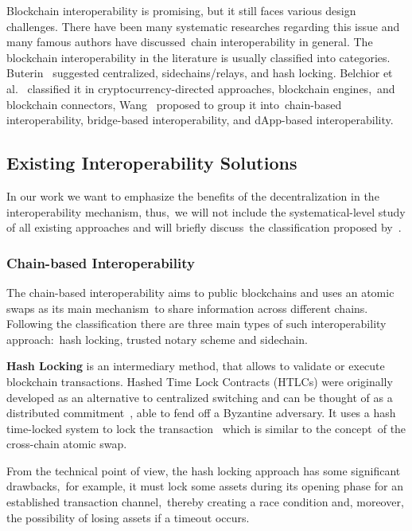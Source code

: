 Blockchain interoperability is promising, but it still faces various design
challenges.
There have been many systematic researches regarding this issue and many famous authors have discussed\
chain interoperability in general.
The blockchain interoperability in the literature is usually classified into categories.
Buterin~\cite{buterin2016} suggested centralized, sidechains/relays, and hash locking.
Belchior et al.~\cite{belchior2021survey} classified it in cryptocurrency-directed approaches, blockchain engines,\
and blockchain connectors, Wang~\cite{cryptoeprint:2021/537} proposed to group it into\
chain-based interoperability, bridge-based interoperability, and dApp-based interoperability.

\subsection{Existing Interoperability Solutions}\label{subsec:interoperability-categories}
In our work we want to emphasize the benefits of the decentralization in the interoperability mechanism, thus,\
we will not include the systematical-level study of all existing approaches and will briefly discuss\
the classification proposed by~\cite{cryptoeprint:2021/537}.

\subsubsection{Chain-based Interoperability}
The chain-based interoperability aims to public blockchains and uses an atomic swaps as its main mechanism\
to share information across different chains.
Following the classification there are three main types of such interoperability approach:\
hash locking, trusted notary scheme and sidechain.

\textbf{Hash Locking} is an intermediary method, that allows to validate or execute blockchain transactions.
Hashed Time Lock Contracts (HTLCs) were originally developed as an alternative to centralized switching
and can be thought of as a distributed commitment~\cite{Kumar2021}, able to fend off a Byzantine adversary.
It uses a hash time-locked system to lock the transaction~\cite{Pillai2019} which is similar to the concept\
of the cross-chain atomic swap.

From the technical point of view, the hash locking approach has some significant drawbacks,\
for example, it must lock some assets during its opening phase for an established transaction channel,\
thereby creating a race condition and, moreover, the possibility of losing assets if a timeout occurs.

